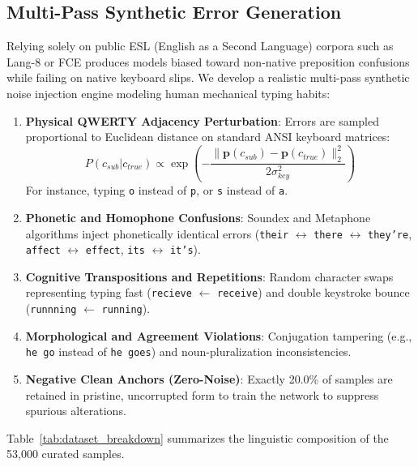 \documentclass[10pt,journal,compsoc]{IEEEtran}
\begin{document}
\subsection{Multi-Pass Synthetic Error Generation}
Relying solely on public ESL (English as a Second Language) corpora such as Lang-8 or FCE produces models biased toward non-native preposition confusions while failing on native keyboard slips. We develop a realistic multi-pass synthetic noise injection engine modeling human mechanical typing habits:
\begin{enumerate}
    \item \textbf{Physical QWERTY Adjacency Perturbation}: Errors are sampled proportional to Euclidean distance on standard ANSI keyboard matrices:
    \begin{equation}
    P(c_{sub} | c_{true}) \propto \exp\left(-\frac{\|\mathbf{p}(c_{sub}) - \mathbf{p}(c_{true})\|_2^2}{2\sigma_{key}^2}\right)
    \end{equation}
    For instance, typing \texttt{o} instead of \texttt{p}, or \texttt{s} instead of \texttt{a}.
    \item \textbf{Phonetic and Homophone Confusions}: Soundex and Metaphone algorithms inject phonetically identical errors (\texttt{their} $\leftrightarrow$ \texttt{there} $\leftrightarrow$ \texttt{they're}, \texttt{affect} $\leftrightarrow$ \texttt{effect}, \texttt{its} $\leftrightarrow$ \texttt{it's}).
    \item \textbf{Cognitive Transpositions and Repetitions}: Random character swaps representing typing fast (\texttt{recieve} $\leftarrow$ \texttt{receive}) and double keystroke bounce (\texttt{runnning} $\leftarrow$ \texttt{running}).
    \item \textbf{Morphological and Agreement Violations}: Conjugation tampering (e.g., \texttt{he go} instead of \texttt{he goes}) and noun-pluralization inconsistencies.
    \item \textbf{Negative Clean Anchors (Zero-Noise)}: Exactly 20.0\% of samples are retained in pristine, uncorrupted form to train the network to suppress spurious alterations.
\end{enumerate}

Table~\ref{tab:dataset_breakdown} summarizes the linguistic composition of the 53,000 curated samples.
\end{document}
